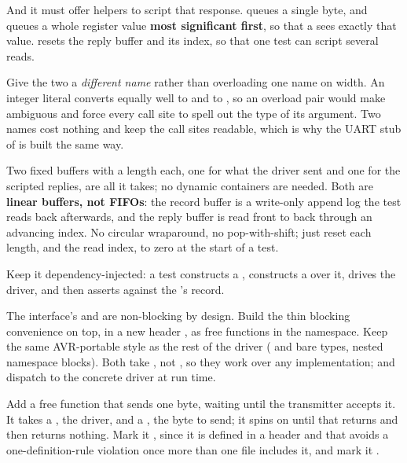 And it must offer helpers to script that response.  queues a single
byte, and  queues a whole register value \textbf{most significant
first}, so that a  sees exactly that value.  resets the reply
buffer and its index, so that one test can script several reads.

Give the two a \emph{different name} rather than overloading one name on width. An integer literal
converts equally well to  and to , so an overload pair would make
 ambiguous and force every call site to spell out the type of its argument.
Two names cost nothing and keep the call sites readable, which is why the UART stub of  is
built the same way.

Two fixed  buffers with a length each, one for what the driver sent and one for the
scripted replies, are all it takes; no dynamic containers are needed. Both are \textbf{linear
buffers, not FIFOs}: the record buffer is a write-only append log the test reads back afterwards, and
the reply buffer is read front to back through an advancing index. No circular wraparound, no
pop-with-shift; just reset each length, and the read index, to zero at the start of a test.

Keep it dependency-injected: a test constructs a , constructs a  over it,
drives the driver, and then asserts against the 's record.

\label{c8:set:2}

\label{c8:ex:2.1}
The interface's  and  are non-blocking by design. Build the thin blocking
convenience on top, in a new header , as free functions in the
 namespace. Keep the same AVR-portable style as the rest of the driver
( and bare types, nested namespace blocks). Both take , not
, so they work over any implementation;  and  dispatch
to the concrete driver at run time.

Add a free function  that sends one byte, waiting until the transmitter accepts
it. It takes a , the driver, and a , the byte to send;
it spins on  until that returns  and then returns nothing. Mark it
, since it is defined in a header and that avoids a one-definition-rule violation once
more than one file includes it, and mark it .

